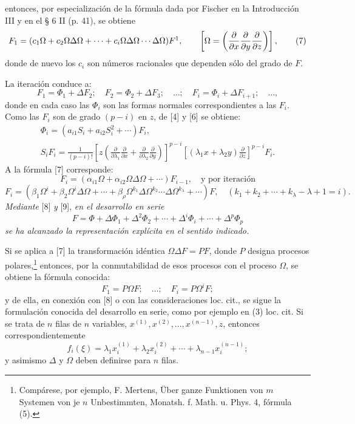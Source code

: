 \documentclass[11pt]{article}
\providecommand{\p}{\partial}
\begin{document}
entonces, por especialización de la fórmula dada por Fischer en la Introducción III y en el § 6 II (p. 41), se obtiene
\begin{equation}
        F_1=(c_1\Omega+c_2\Omega\Delta\Omega+\cdots+c_i\Omega\Delta\Omega\cdots\Delta\Omega)F\footnotemark,
        \qquad \left[\Omega=\left(\frac{\p}{\p x}\frac{\p}{\p y}\frac{\p}{\p z}\right)\right],
\tag{7}
\end{equation}
donde de nuevo los \(c_i\) son números racionales que dependen sólo del grado de \(F\).

La iteración conduce a:
\[
        F_1=\Phi_1+\Delta F_2;\quad F_2=\Phi_2+\Delta F_3;\quad\ldots;\quad
        F_i=\Phi_i+\Delta F_{i+1};\quad\ldots,
\]
donde en cada caso las \(\Phi_i\) son las formas normales correspondientes a las \(F_i\). Como las \(F_i\) son de grado \((p-i)\) en \(z\), de [4] y [6] se obtiene:
\begin{equation}
\begin{gathered}
        \Phi_i=(a_{i1}S_i+a_{i2}S_i^2+\cdots)F_i,\\
        S_iF_i=\frac1{(p-i)!}
        \left[z\left(\frac{\p}{\p\lambda_1}\frac{\p}{\p x}+
        \frac{\p}{\p\lambda_2}\frac{\p}{\p y}\right)\right]^{p-i}
        \left[(\lambda_1x+\lambda_2y)\frac{\p}{\p z}\right]^{p-i}F_i.
\end{gathered}
\tag{8}
\end{equation}
A la fórmula [7] corresponde:
\[
        F_i=(\alpha_{i1}\Omega+\alpha_{i2}\Omega\Delta\Omega+\cdots)F_{i-1},
        \quad\text{y por iteración}
\]
\begin{equation}
        F_i=(\beta_1\Omega^i+\beta_2\Omega^i\Delta\Omega+\cdots
        +\beta_\rho\Omega^{k_1}\Delta\Omega^{k_2}\cdots\Delta\Omega^{k_\lambda}+\cdots)F,
        \quad(k_1+k_2+\cdots+k_\lambda-\lambda+1=i).
\tag{9}
\end{equation}
\emph{Mediante} [8] \emph{y} [9], \emph{en el desarrollo en serie}
\[
        F=\Phi+\Delta\Phi_1+\Delta^2\Phi_2+\cdots+\Delta^i\Phi_i+\cdots+\Delta^p\Phi_p
\]
\emph{se ha alcanzado la representación explícita en el sentido indicado.}

Si se aplica a [7] la transformación idéntica \(\Omega\Delta F=PF\), donde \(P\) designa procesos polares,\footnote{Compárese, por ejemplo, F. Mertens, Über ganze Funktionen von \(m\) Systemen von je \(n\) Unbestimmten, Monatsh. f. Math. u. Phys. 4, fórmula (5).} entonces, por la conmutabilidad de esos procesos con el proceso \(\Omega\), se obtiene la fórmula conocida:
\[
        F_1=P\Omega F;\quad\ldots;\quad F_i=P\Omega^iF;
\]
y de ella, en conexión con [8] o con las consideraciones loc. cit., se sigue la formulación conocida del desarrollo en serie, como por ejemplo en (3) loc. cit. Si se trata de \(n\) filas de \(n\) variables, \(x^{(1)},x^{(2)},\ldots,x^{(n-1)},z\), entonces correspondientemente
\[
        f_i(\xi)=\lambda_1x_i^{(1)}+\lambda_2x_i^{(2)}+\cdots+\lambda_{n-1}x_i^{(n-1)};
\]
y asimismo \(\Delta\) y \(\Omega\) deben definirse para \(n\) filas.
\end{document}
